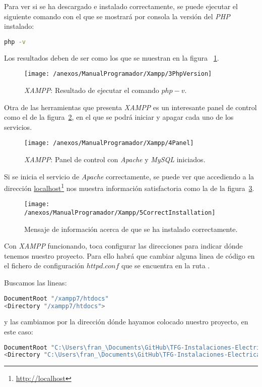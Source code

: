 Para ver si se ha descargado e instalado correctamente, se puede ejecutar el siguiente comando con el que se mostrará por consola la versión del \textit{PHP} instalado:
\begin{lstlisting}[language=bash]
			php -v
\end{lstlisting}

Los resultados deben de ser como los que se muestran en la figura ~\ref{img:XAMPP_PHP_v}.

\begin{figure}[h]
	\centering
	\texttt{[image: /anexos/ManualProgramador/Xampp/3PhpVersion]}
	\caption{\textit{XAMPP}: Resultado de ejecutar el comando $php -v$.}
	\label{img:XAMPP_PHP_v}
\end{figure}

Otra de las herramientas que presenta \textit{XAMPP} es un interesante panel de control como el de la figura~\ref{img:XAMPP_Panel}, en el que se podrá iniciar y apagar cada uno de los servicios.

\begin{figure}[h]
	\centering
	\texttt{[image: /anexos/ManualProgramador/Xampp/4Panel]}
	\caption{\textit{XAMPP}: Panel de control con \textit{Apache} y \textit{MySQL} iniciados.}
	\label{img:XAMPP_Panel}
\end{figure}

Si se inicia el servicio de \textit{Apache} correctamente, se puede ver que accediendo a la dirección \href{http://localhost}{localhost}\footnote{\url{http://localhost}} nos muestra información satisfactoria como la de la figura~\ref{img:XAMPP_Correct}.

\begin{figure}[h]
	\centering
	\texttt{[image: /anexos/ManualProgramador/Xampp/5CorrectInstallation]}
	\caption{Mensaje de información acerca de que se ha instalado correctamente.}
	\label{img:XAMPP_Correct}
\end{figure}

Con \textit{XAMPP} funcionando, toca configurar las direcciones para indicar dónde tenemos nuestro proyecto. Para ello habrá que cambiar alguna linea de código en el fichero de configuración $httpd.conf$ que se encuentra en la ruta \textit{}.

Buscamos las lineas: 
\begin{lstlisting}[language=bash]
DocumentRoot "/xampp7/htdocs"
<Directory "/xampp7/htdocs">
\end{lstlisting}
y las cambiamos por la dirección dónde hayamos colocado nuestro proyecto, en este caso: 
\begin{lstlisting}[language=bash]
DocumentRoot "C:\Users\fran_\Documents\GitHub\TFG-Instalaciones-Electricas\web\instalaciones_electricas"
<Directory "C:\Users\fran_\Documents\GitHub\TFG-Instalaciones-Electricas\web\instalaciones_electricas">
\end{lstlisting}

